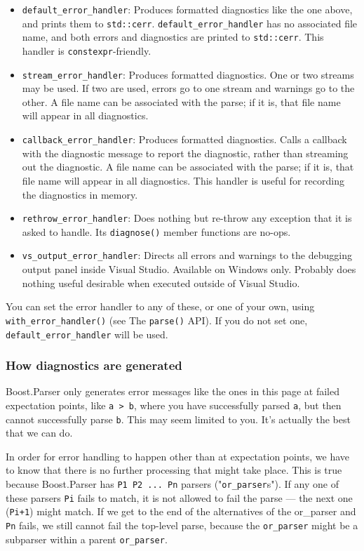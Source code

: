 \begin{itemize}
\item
  \texttt{default\_error\_handler}: Produces formatted diagnostics like the one above, and prints them to \texttt{std::cerr}. \texttt{default\_error\_handler} has no associated file name, and both errors and diagnostics are printed to \texttt{std::cerr}. This handler is \texttt{constexpr}-friendly.
\item
  \texttt{stream\_error\_handler}: Produces formatted diagnostics. One or two streams may be used. If two are used, errors go to one stream and warnings go to the other. A file name can be associated with the parse; if it is, that file name will appear in all diagnostics.
\item
  \texttt{callback\_error\_handler}: Produces formatted diagnostics. Calls a callback with the diagnostic message to report the diagnostic, rather than streaming out the diagnostic. A file name can be associated with the parse; if it is, that file name will appear in all diagnostics. This handler is useful for recording the diagnostics in memory.
\item
  \texttt{rethrow\_error\_handler}: Does nothing but re-throw any exception that it is asked to handle. Its \texttt{diagnose()} member functions are no-ops.
\item
  \texttt{vs\_output\_error\_handler}: Directs all errors and warnings to the debugging output panel inside Visual Studio. Available on Windows only. Probably does nothing useful desirable when executed outside of Visual Studio.
\end{itemize}

You can set the error handler to any of these, or one of your own, using \texttt{with\_error\_handler()} (see The \texttt{parse()} API). If you do not set one, \texttt{default\_error\_handler} will be used.

\subsubsection{How diagnostics are generated}

Boost.Parser only generates error messages like the ones in this page at failed expectation points, like \texttt{a > b}, where you have successfully parsed \texttt{a}, but then cannot successfully parse \texttt{b}. This may seem limited to you. It's actually the best that we can do.

In order for error handling to happen other than at expectation points, we have to know that there is no further processing that might take place. This is true because Boost.Parser has \texttt{P1 \textbar{} P2 \textbar{} ... \textbar{} Pn} parsers ("\texttt{or\_parser}s"). If any one of these parsers \texttt{Pi} fails to match, it is not allowed to fail the parse --- the next one (\texttt{Pi+1}) might match. If we get to the end of the alternatives of the or\_parser and \texttt{Pn} fails, we still cannot fail the top-level parse, because the \texttt{or\_parser} might be a subparser within a parent \texttt{or\_parser}.

